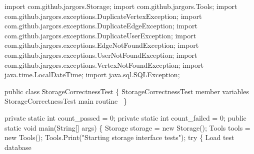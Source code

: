 \documentclass{article}
\def\nwendcode{\endtrivlist \endgroup}
\let\nwdocspar=\par
\begin{document}
\nwenddocs{}\endmoddef{}
import com.github.jargors.Storage;
import com.github.jargors.Tools;
import com.github.jargors.exceptions.DuplicateVertexException;
import com.github.jargors.exceptions.DuplicateEdgeException;
import com.github.jargors.exceptions.DuplicateUserException;
import com.github.jargors.exceptions.EdgeNotFoundException;
import com.github.jargors.exceptions.UserNotFoundException;
import com.github.jargors.exceptions.VertexNotFoundException;
import java.time.LocalDateTime;
import java.sql.SQLException;
\nwendcode{}\nwdocspar
\nwenddocs{}\endmoddef{}
public class StorageCorrectnessTest \{
  \LA{}\code{}StorageCorrectnessTest\edoc{} member variables~{\nwtagstyle{}}\RA{}
  \LA{}\code{}StorageCorrectnessTest\edoc{} main routine~{\nwtagstyle{}}\RA{}
\}
\nwendcode{}\nwdocspar
\nwenddocs{}\endmoddef{}
private static int count_passed = 0;
private static int count_failed = 0;
\eatline
{}\nwendcode{}\endmoddef{}
public static void main(String[] args) \{
  Storage storage = new Storage();
  Tools tools = new Tools();
  Tools.Print("Starting storage interface tests");
  try \{
    \LA{}Load test database~{\nwtagstyle{}}\RA{}
\end{document}
